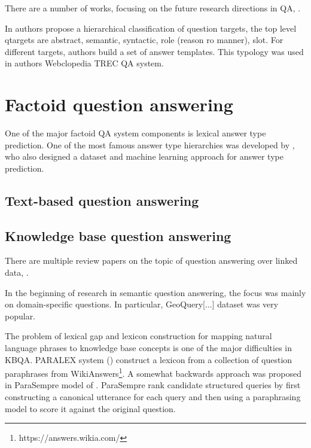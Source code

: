 %

\label{chap:related}


There are a number of works, focusing on the future research directions in QA, \eg \cite{burger2001issues}.

In \cite{Hovy:2002:QTS:1289189.1289206} authors propose a hierarchical classification of question targets, the top level qtargets are abstract, semantic, syntactic, role (reason ro manner), slot. For different targets, authors build a set of answer templates. This typology was used in authors Webclopedia TREC QA system.




\section{Factoid question answering}

One of the major factoid QA system components is lexical answer type prediction.
One of the most famous answer type hierarchies was developed by \cite{li2006learning}, who also designed a dataset and machine learning approach for answer type prediction.




\subsection{Text-based question answering}



\subsection{Knowledge base question answering}

There are multiple review papers on the topic of question answering over linked data, \eg \cite{unger2014introduction}.

In the beginning of research in semantic question answering, the focus was mainly on domain-specific questions.
In particular, GeoQuery[...] dataset was very popular.

The problem of lexical gap and lexicon construction for mapping natural language phrases to knowledge base concepts is one of the major difficulties in KBQA.
PARALEX system (\cite{fader2013paraphrase}) construct a lexicon from a collection of question paraphrases from WikiAnswers\footnote{https://answers.wikia.com/}.
A somewhat backwards approach was proposed in ParaSempre model of \cite{BerantL14:parasempre}.
ParaSempre rank candidate structured queries by first constructing a canonical utterance for each query and then using a paraphrasing model to score it against the original question.


